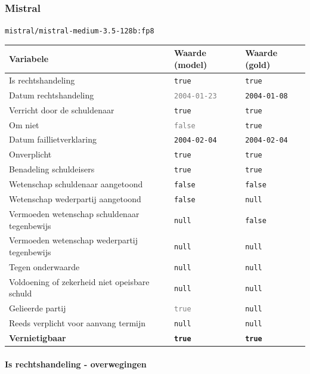 \documentclass[
  dutch,
  a4paper,
]{article}
\begin{document}
\subsubsection{Mistral}\label{mistral-16}

\texttt{mistral/mistral-medium-3.5-128b:fp8}

\begin{center}
\small
\begin{tabular}{@{}p{7.4cm}p{2.6cm}p{2.6cm}@{}}
\toprule
Variabele & Waarde (model) & Waarde (gold) \\
\midrule
Is rechtshandeling & \texttt{true} & \texttt{true} \\
Datum rechtshandeling & \textcolor{gray}{\texttt{2004-01-23}} & \texttt{2004-01-08} \\
Verricht door de schuldenaar & \texttt{true} & \texttt{true} \\
Om niet & \textcolor{gray}{\texttt{false}} & \texttt{true} \\
Datum faillietverklaring & \texttt{2004-02-04} & \texttt{2004-02-04} \\
Onverplicht & \texttt{true} & \texttt{true} \\
Benadeling schuldeisers & \texttt{true} & \texttt{true} \\
Wetenschap schuldenaar aangetoond & \texttt{false} & \texttt{false} \\
Wetenschap wederpartij aangetoond & \texttt{false} & \texttt{null} \\
Vermoeden wetenschap schuldenaar tegenbewijs & \texttt{null} & \texttt{false} \\
Vermoeden wetenschap wederpartij tegenbewijs & \texttt{null} & \texttt{null} \\
Tegen onderwaarde & \texttt{null} & \texttt{null} \\
Voldoening of zekerheid niet opeisbare schuld & \texttt{null} & \texttt{null} \\
Gelieerde partij & \textcolor{gray}{\texttt{true}} & \texttt{null} \\
Reeds verplicht voor aanvang termijn & \texttt{null} & \texttt{null} \\
\textbf{Vernietigbaar} & \textbf{\texttt{true}} & \textbf{\texttt{true}} \\
\bottomrule
\end{tabular}
\end{center}

\paragraph{Is rechtshandeling - overwegingen}\label{is-rechtshandeling---overwegingen-48}
\end{document}
